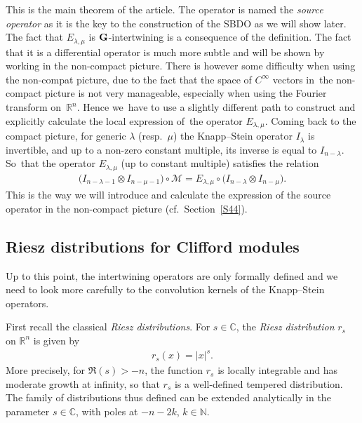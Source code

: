 \documentclass[10pt,a4paper]{amsart}
\numberwithin{equation}{section}
\begin{document}
 This is the main theorem of the article. The operator is named the \emph{source operator} as it is the key to the construction of the SBDO as we will show later. The fact that $E_{\lambda,\mu}$ is $\bf G$-intertwining is a consequence of the definition. The fact that it is a differential operator is much more subtle and will be shown by working in the non-compact picture. There is however some difficulty when using the non-compat picture, due to the fact that the space of $C^\infty$ vectors in~the non-compact picture is not very manageable, especially when using the Fourier transform on~$\mathbb R^n$. Hence we~have to use a slightly different path to construct and explicitly calculate the local expression of~the operator $E_{\lambda, \mu}$. Coming back to the compact picture, for generic $\lambda$ (resp.~$\mu$) the Knapp--Stein operator $I_\lambda$ is invertible, and up to a non-zero constant multiple, its inverse is equal to $I_{n-\lambda}$. So~that the operator $E_{\lambda, \mu}$ (up to constant multiple) satisfies the relation
\begin{gather*}
\big(I_{n-\lambda-1} \otimes I_{n-\mu-1}\big) \circ \mathcal{M} = E_{\lambda, \mu} \circ \big(I_{n-\lambda} \otimes I_{ n-\mu}\big) .
\end{gather*}
This is the way we will introduce and calculate the expression of the source operator in the non-compact picture (cf.~Section~\ref{S44}).


\subsection{Riesz distributions for Clifford modules}\label{S42}
Up to this point, the intertwining operators are only formally defined and we need to look more carefully to the convolution kernels of the Knapp--Stein operators.

First recall the classical \emph{Riesz distributions}. For $s\in \mathbb C$, the \emph{Riesz distribution} $r_s$ on $\mathbb R^n$ is given by
\begin{gather*}
r_s(x) = \vert x\vert^s .
\end{gather*}
More precisely, for $\Re(s)>-n$, the function $r_s$ is locally integrable and has moderate growth at infinity, so that $r_s$ is a well-defined tempered distribution. The family of distributions thus defined can be extended analytically in the parameter $s\in \mathbb C$, with poles at $ -n-2k$, $k\in \mathbb N$.
\end{document}
